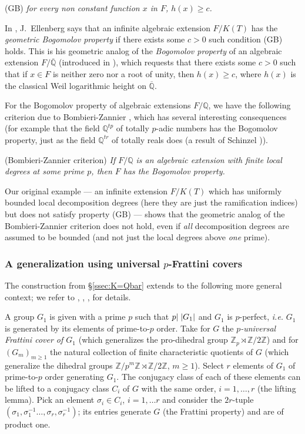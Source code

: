 \documentclass[12pt,english]{amsart}
\newtheorem{twisting lemma}[theorem]{Twisting lemma}
\begin{document}
\noindent
{\rm (GB)}  {\it for every non constant function $x$ in $F$, $h(x)\geq c$.}

\vskip 2mm
In \cite{Eblog}, J.~Ellenberg says that an infinite algebraic extension $F/K(T)$ has the {\it geometric Bogomolov property} if there exists some $c>0$ such condition (GB) holds. 
This is his geometric analog of the {\it Bogomolov property} of an algebraic 
extension $F/\overline {\mathbb{Q}}$ (introduced in \cite{BZ}), which requests that there exists some $c>0$ such that if $x\in F$ is neither zero nor a root of unity, then $h(x)\geq c$, where $h(x)$ is the classical Weil logarithmic height on $\overline {\mathbb{Q}}$.

For the Bogomolov property of algebraic extensions $F/{\mathbb{Q}}$, we have the following criterion due to Bombieri-Zannier \cite[theorem 2]{BZ}, which has several interesting consequences (for example that the 
field $\mathbb{Q}^{tp}$ of totally $p$-adic numbers has the Bogomolov property, just as the field $\mathbb{Q}^{tr}$ 
of totally reals does (a result of Schinzel \cite{Schi})).

\vskip 2mm

\noindent
{(Bombieri-Zannier criterion)} {\it If $F/\mathbb{Q}$ is an algebraic extension with finite local degrees at some prime $p$, then $F$ has the Bogomolov property. 
}

\vskip 2mm

Our original example --- an infinite extension $F/K(T)$ which has uniformly 
bounded local decomposition degrees  (here they are just the ramification 
indices) but does not satisfy property {\rm (GB)}  --- shows that the geometric 
analog of the Bombieri-Zannier criterion does not hold, even if {\it all} 
decomposition degrees are assumed to be bounded (and not just 
the local degrees above {\it one} prime).

\subsubsection{A generalization using universal $p$-Frattini covers} 
The construction from \S \ref{ssec:K=Qbar}
extends to the following more general context; we refer to  \cite{Fr_introMT}, 
\cite[\S 22]{FrJa}, \cite{DeLy04}, for details. 

A group $G_1$ is given with a prime $p$ such that $p| \hskip 1mm |G_1|$ and $G_1$ is $p$-perfect, {\it i.e.} $G_1$ is generated by its elements of prime-to-$p$ order. Take for $G$ the {\it $p$-universal Frattini cover of $G_1$} (which generalizes the pro-dihedral group ${\mathbb{Z}}_p\rtimes {\mathbb{Z}}/2{\mathbb{Z}}$) and for $(G_m)_{m\geq 1}$ the natural collection of finite characteristic quotients of $G$ (which generalize the dihedral groups ${\mathbb{Z}}/p^m {\mathbb{Z}} \rtimes {\mathbb{Z}}/2{\mathbb{Z}}$, $m\geq 1$). Select $r$ elements of $G_1$
of prime-to-$p$ order generating $G_1$.  The conjugacy class of each of these elements
can be lifted to a conjugacy class $C_i$ of $G$ with the same order, $i=1,\ldots,r$ ({the lifting lemma}).
Pick an element $\sigma_i\in C_i$, $i=1,\ldots r$ and consider the $2r$-tuple $(\sigma_1,\sigma_1^{-1}\ldots,\sigma_r,\sigma_r^{-1})$; its entries generate $G$ (the Frattini property) and are of product one.
\end{document}
